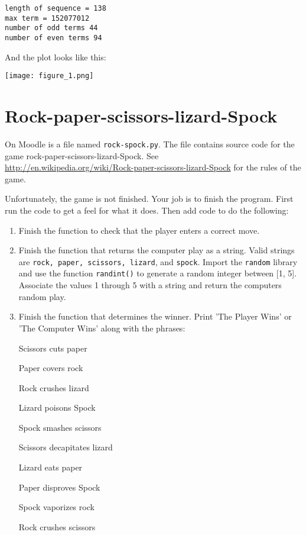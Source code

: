 \documentclass[12pt]{article}
\begin{document}
\begin{enumerate}
\begin{lstlisting}[style=bash]
length of sequence = 138
max term = 152077012
number of odd terms 44
number of even terms 94
\end{lstlisting}

And the plot looks like this:

\texttt{[image: figure\_1.png]}


\section*{Rock-paper-scissors-lizard-Spock}

On Moodle is a file named \texttt{rock-spock.py}. The file
  contains source code for the game
  rock-paper-scissors-lizard-Spock. See
\\\url{http://en.wikipedia.org/wiki/Rock-paper-scissors-lizard-Spock}
for the rules of the game. 

Unfortunately, the game is not finished. Your job is to finish the program. First run the code to
  get a feel for what it does. Then add code to do the following:

\begin{enumerate}
\item Finish the function to check that the player enters a correct move.

\item Finish the function that returns the computer play as a string. Valid strings are \texttt{rock, paper, scissors, lizard}, and \texttt{spock}. Import the \texttt{random} library and use the function \texttt{randint()} to generate a random integer between [1, 5]. Associate the values 1 through 5 with a string and return the computers random play.

\item Finish the function that determines the winner. Print 'The Player Wins' or 'The Computer Wins' along with the phrases:

    Scissors cuts paper
    
    Paper covers rock
    
    Rock crushes lizard
    
    Lizard poisons Spock
    
    Spock smashes scissors
    
    Scissors decapitates lizard
    
    Lizard eats paper
    
    Paper disproves Spock
    
    Spock vaporizes rock
    
    Rock crushes scissors


\end{enumerate}
\end{enumerate}
\end{document}
